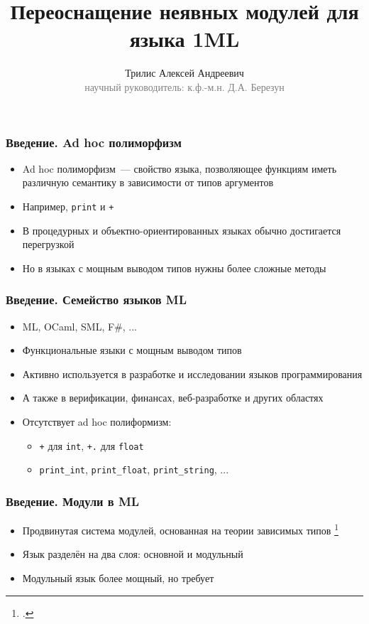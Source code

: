 \documentclass{beamer}
\begin{document}
\title[Неявные модули в 1ML]{Переоснащение неявных модулей для языка 1ML }
\author[Трилис А.А.]{Трилис Алексей Андреевич\\{\footnotesize\textcolor{gray}{научный руководитель: к.ф.-м.н. Д.А. Березун}}}
\frame{\titlepage}

\begin{frame}\frametitle{Введение. Ad hoc полиморфизм}
\begin{itemize}
  \item Ad hoc полиморфизм~--- свойство языка, позволяющее функциям иметь различную семантику в зависимости от типов аргументов
  \item Например, \texttt{print} и \texttt{+}
  \item В процедурных и объектно-ориентированных языках обычно достигается перегрузкой
  \item Но в языках с мощным выводом типов нужны более сложные методы
\end{itemize}
\end{frame}

\begin{frame}\frametitle{Введение. Семейство языков ML}
\begin{itemize}
  \item ML, OCaml, SML, F\#, ...
  \item Функциональные языки с мощным выводом типов
  \item Активно используется в разработке и исследовании языков программирования
  \item А также в верификации, финансах, веб-разработке и других областях
  \item Отсутствует ad hoc полиформизм:
  \begin{itemize}
    \item \texttt{+} для \texttt{int}, \texttt{+.} для \texttt{float}
    \item \texttt{print\_int}, \texttt{print\_float}, \texttt{print\_string}, ...
  \end{itemize}
\end{itemize}
\end{frame}

\begin{frame}\frametitle{Введение. Модули в ML}
\begin{itemize}
  \item Продвинутая система модулей, основанная на теории зависимых типов \footcite{dependent_types}
  \item Язык разделён на два слоя: основной и модульный
  \item Модульный язык более мощный, но требует 
\end{itemize}
\end{frame}
\end{document}

